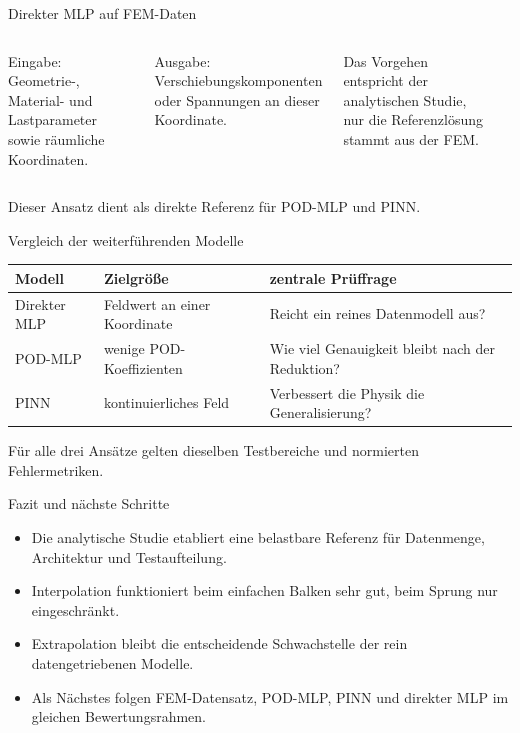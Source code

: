 \documentclass[aspectratio=169,10pt]{beamer}
\begin{document}
\begin{frame}{Direkter MLP auf FEM-Daten}
\begin{columns}[T]
Eingabe: Geometrie-, Material- und Lastparameter sowie räumliche Koordinaten.

Ausgabe: Verschiebungskomponenten oder Spannungen an dieser Koordinate.

Das Vorgehen entspricht der analytischen Studie, nur die Referenzlösung stammt aus der FEM.
\begin{center}\end{center}
\end{columns}
\vfill Dieser Ansatz dient als direkte Referenz für POD-MLP und PINN.
\end{frame}

\begin{frame}{Vergleich der weiterführenden Modelle}
\centering\begin{tabular}{p{.22\linewidth}p{.31\linewidth}p{.33\linewidth}}\toprule
Modell & Zielgröße & zentrale Prüffrage\\ \midrule
Direkter MLP & Feldwert an einer Koordinate & Reicht ein reines Datenmodell aus?\\
POD-MLP & wenige POD-Koeffizienten & Wie viel Genauigkeit bleibt nach der Reduktion?\\
PINN & kontinuierliches Feld & Verbessert die Physik die Generalisierung?\\ \bottomrule
\end{tabular}
\vfill Für alle drei Ansätze gelten dieselben Testbereiche und normierten Fehlermetriken.
\end{frame}

\begin{frame}{Fazit und nächste Schritte}
\begin{itemize}
\item Die analytische Studie etabliert eine belastbare Referenz für Datenmenge, Architektur und Testaufteilung.
\item Interpolation funktioniert beim einfachen Balken sehr gut, beim Sprung nur eingeschränkt.
\item Extrapolation bleibt die entscheidende Schwachstelle der rein datengetriebenen Modelle.
\item Als Nächstes folgen FEM-Datensatz, POD-MLP, PINN und direkter MLP im gleichen Bewertungsrahmen.
\end{itemize}
\end{frame}
\end{document}
